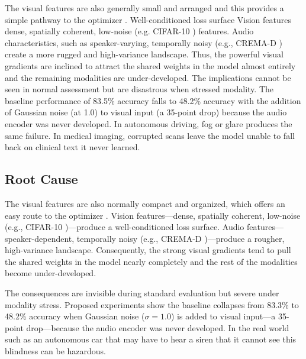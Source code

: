 \documentclass{ieeeaccess}
\begin{document}
The visual features are also generally small and arranged and this provides a simple pathway to the optimizer \cite{pezeshki2021gradient}. Well-conditioned loss surface Vision features dense, spatially coherent, low-noise (e.g. CIFAR-10 \cite{krizhevsky2009learning}) features. Audio characteristics, such as speaker-varying, temporally noisy (e.g., CREMA-D \cite{cao2014crema}) create a more rugged and high-variance landscape. Thus, the powerful visual gradients are inclined to attract the shared weights in the model almost entirely and the remaining modalities are under-developed. The implications cannot be seen in normal assessment but are disastrous when stressed modality. The baseline performance of 83.5\% accuracy falls to 48.2\% accuracy with the addition of Gaussian noise (at 1.0) to visual input (a 35-point drop) because the audio encoder was never developed. In autonomous driving, fog or glare produces the same failure. In medical imaging, corrupted scans leave the model unable to fall back on clinical text it never learned.

\subsection*{Root Cause}
The visual features are also normally compact and organized, which offers an easy route to the optimizer \cite{pezeshki2021gradient}. Vision features---dense, spatially coherent, low-noise (e.g., CIFAR-10 \cite{krizhevsky2009learning})---produce a well-conditioned loss surface. Audio features---speaker-dependent, temporally noisy (e.g., CREMA-D \cite{cao2014crema})---produce a rougher, high-variance landscape. Consequently, the strong visual gradients tend to pull the shared weights in the model nearly completely and the rest of the modalities become under-developed.

The consequences are invisible during standard evaluation but severe under modality stress. Proposed experiments show the baseline collapses from 83.3\% to 48.2\% accuracy when Gaussian noise ($\sigma = 1.0$) is added to visual input---a 35-point drop---because the audio encoder was never developed. In the real world such as an autonomous car that may have to hear a siren that it cannot see this blindness can be hazardous.
\end{document}
